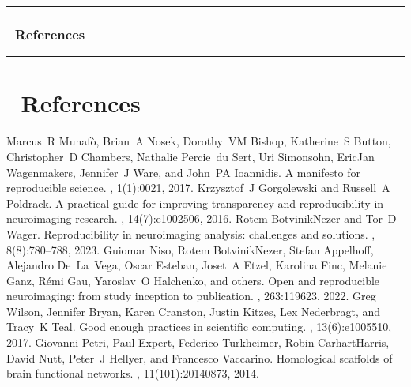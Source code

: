 \documentclass[letterpaper,10pt,english]{jupyterBook}
\begin{document}
\bigskip\hrule\bigskip



\subsection{📑 References}
\label{\detokenize{chapters/03/03c_visualization-examples:references}}

\bigskip\hrule\bigskip


\sphinxstepscope


\chapter{📑 References}
\label{\detokenize{chapters/04/references:references}}\label{\detokenize{chapters/04/references::doc}}
\begin{sphinxthebibliography}{10}
\sphinxAtStartPar
Marcus R Munafò, Brian A Nosek, Dorothy VM Bishop, Katherine S Button, Christopher D Chambers, Nathalie Percie du Sert, Uri Simonsohn, Eric\sphinxhyphen{}Jan Wagenmakers, Jennifer J Ware, and John PA Ioannidis. A manifesto for reproducible science. , 1(1):0021, 2017.
\sphinxAtStartPar
Krzysztof J Gorgolewski and Russell A Poldrack. A practical guide for improving transparency and reproducibility in neuroimaging research. , 14(7):e1002506, 2016.
\sphinxAtStartPar
Rotem Botvinik\sphinxhyphen{}Nezer and Tor D Wager. Reproducibility in neuroimaging analysis: challenges and solutions. , 8(8):780–788, 2023.
\sphinxAtStartPar
Guiomar Niso, Rotem Botvinik\sphinxhyphen{}Nezer, Stefan Appelhoff, Alejandro De La Vega, Oscar Esteban, Joset A Etzel, Karolina Finc, Melanie Ganz, Rémi Gau, Yaroslav O Halchenko, and others. Open and reproducible neuroimaging: from study inception to publication. , 263:119623, 2022.
\sphinxAtStartPar
Greg Wilson, Jennifer Bryan, Karen Cranston, Justin Kitzes, Lex Nederbragt, and Tracy K Teal. Good enough practices in scientific computing. , 13(6):e1005510, 2017.
\sphinxAtStartPar
Giovanni Petri, Paul Expert, Federico Turkheimer, Robin Carhart\sphinxhyphen{}Harris, David Nutt, Peter J Hellyer, and Francesco Vaccarino. Homological scaffolds of brain functional networks. , 11(101):20140873, 2014.

\end{sphinxthebibliography}
\end{document}
